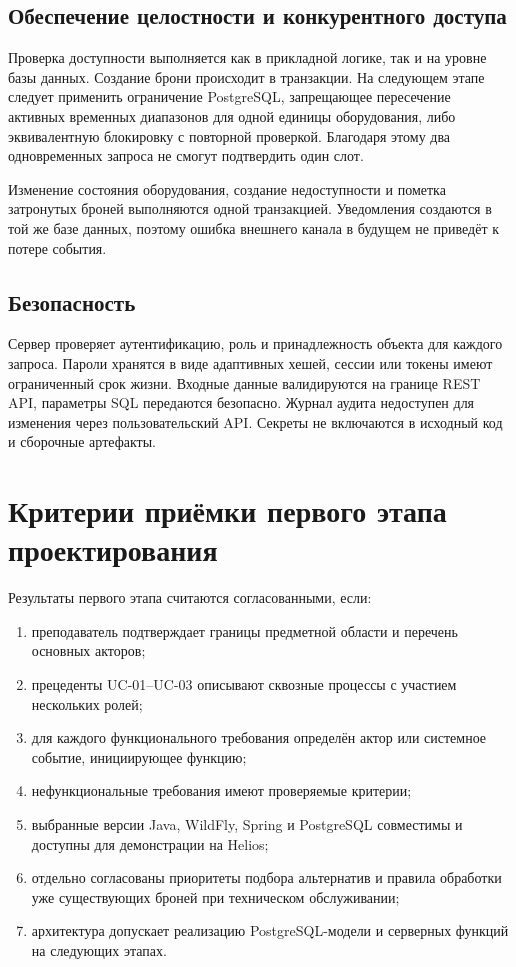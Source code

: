 \documentclass[12pt,a4paper]{article}
\begin{document}
\subsection{Обеспечение целостности и конкурентного доступа}

Проверка доступности выполняется как в прикладной логике, так и на уровне базы
данных. Создание брони происходит в транзакции. На следующем этапе следует
применить ограничение PostgreSQL, запрещающее пересечение активных временных
диапазонов для одной единицы оборудования, либо эквивалентную блокировку с
повторной проверкой. Благодаря этому два одновременных запроса не смогут
подтвердить один слот.

Изменение состояния оборудования, создание недоступности и пометка затронутых
броней выполняются одной транзакцией. Уведомления создаются в той же базе данных,
поэтому ошибка внешнего канала в будущем не приведёт к потере события.

\subsection{Безопасность}

Сервер проверяет аутентификацию, роль и принадлежность объекта для каждого
запроса. Пароли хранятся в виде адаптивных хешей, сессии или токены имеют
ограниченный срок жизни. Входные данные валидируются на границе REST API,
параметры SQL передаются безопасно. Журнал аудита недоступен для изменения через
пользовательский API. Секреты не включаются в исходный код и сборочные артефакты.

\section{Критерии приёмки первого этапа проектирования}

Результаты первого этапа считаются согласованными, если:

\begin{enumerate}
    \item преподаватель подтверждает границы предметной области и перечень
    основных акторов;
    \item прецеденты UC-01--UC-03 описывают сквозные процессы с участием
    нескольких ролей;
    \item для каждого функционального требования определён актор или системное
    событие, инициирующее функцию;
    \item нефункциональные требования имеют проверяемые критерии;
    \item выбранные версии Java, WildFly, Spring и PostgreSQL совместимы и
    доступны для демонстрации на Helios;
    \item отдельно согласованы приоритеты подбора альтернатив и правила
    обработки уже существующих броней при техническом обслуживании;
    \item архитектура допускает реализацию PostgreSQL-модели и серверных
    функций на следующих этапах.
\end{enumerate}
\end{document}

